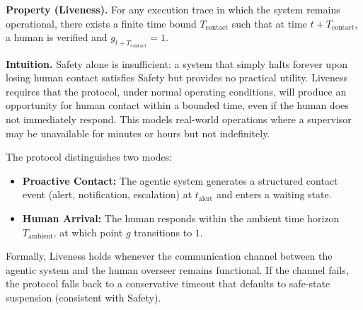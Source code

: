 \textbf{Property (Liveness).} For any execution trace in which the system remains operational, there exists a finite time bound $T_{\text{contact}}$ such that at time $t + T_{\text{contact}}$, a human is verified and $g_{t+T_{\text{contact}}} = 1$.

\textbf{Intuition.} Safety alone is insufficient: a system that simply halts forever upon losing human contact satisfies Safety but provides no practical utility. Liveness requires that the protocol, under normal operating conditions, will produce an opportunity for human contact within a bounded time, even if the human does not immediately respond. This models real-world operations where a supervisor may be unavailable for minutes or hours but not indefinitely.

The protocol distinguishes two modes:
\begin{itemize}
\item \textbf{Proactive Contact:} The agentic system generates a structured contact event (alert, notification, escalation) at $t_{\text{alert}}$ and enters a waiting state.
\item \textbf{Human Arrival:} The human responds within the ambient time horizon $T_{\text{ambient}}$, at which point $g$ transitions to $1$.
\end{itemize}

Formally, Liveness holds whenever the communication channel between the agentic system and the human overseer remains functional. If the channel fails, the protocol falls back to a conservative timeout that defaults to safe-state suspension (consistent with Safety).

